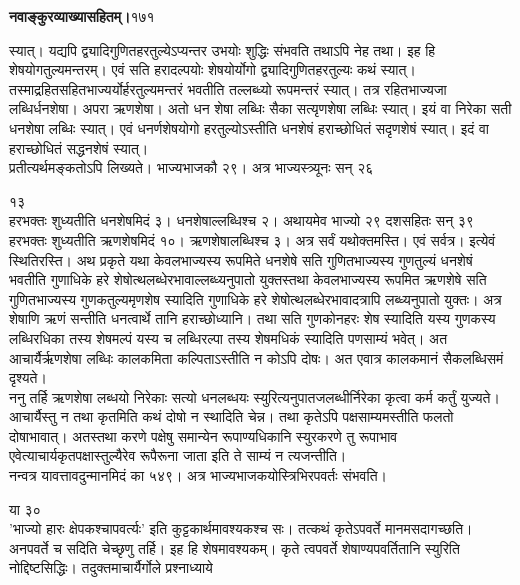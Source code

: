 \documentclass[11pt, openany]{book}
\begin{document}
\onehalfspacing
\hspace{2in}\textbf{नवाङ्कुरव्याख्यासहितम्।}\hspace{2in}१७१

\vspace{5mm}

\begin{sloppypar}
\hangindent=0.2in स्यात्। यद्यपि द्व्यादिगुणितहरतुल्येऽप्यन्तर उभयोः शुद्धिः संभवति तथाऽपि नेह तथा। इह हि शेषयोगतुल्यमन्तरम्। एवं सति हरादल्पयोः शेषयोर्योगो द्व्यादिगुणितहरतुल्यः कथं स्यात्। तस्माद्रहितसहितभाज्यर्योर्हरतुल्यमन्तरं भवतीति तल्लब्ध्यो रूपमन्तरं स्यात्। तत्र रहितभाज्यजा लब्धिर्धनशेषा। अपरा ऋणशेषा। अतो धन शेषा लब्धिः सैका सत्यृणशेषा लब्धिः स्यात्। इयं वा निरेका सती धनशेषा लब्धिः स्यात्। एवं धनर्णशेषयोगो हरतुल्योऽस्तीति धनशेषं हराच्छोधितं सदृणशेषं स्यात्। इदं वा हराच्छोधितं सद्धनशेषं स्यात्।\\

\hangindent=0.2in \hspace{0.2in}प्रतीत्यर्थमङ्कतोऽपि लिख्यते। भाज्यभाजकौ २९। अत्र भाज्यस्त्र्यूनः सन् २६ 

\hspace{2.85in}१३\\

\hangindent=0.2in हरभक्तः शुध्यतीति धनशेषमिदं ३। धनशेषाल्लब्धिश्च २। अथायमेव भाज्यो २९ दशसहितः सन् ३९ हरभक्तः शुध्यतीति ऋणशेषमिदं १०। ऋणशेषालब्धिश्च ३। अत्र सर्वं यथोक्तमस्ति। एवं सर्वत्र। इत्येवं स्थितिरस्ति। अथ प्रकृते यथा केवलभाज्यस्य रूपमिते धनशेषे सति गुणितभाज्यस्य गुणतुल्यं धनशेषं भवतीति गुणाधिके हरे शेषोत्थलब्धेरभावाल्लब्ध्यनुपातो युक्तस्तथा केवलभाज्यस्य रूपमित ऋणशेषे सति गुणितभाज्यस्य गुणकतुल्यमृणशेष स्यादिति गुणाधिके हरे शेषोत्थलब्धेरभावादत्रापि लब्ध्यनुपातो युक्तः। अत्र शेषाणि ऋणं सन्तीति धनत्वार्थे तानि हराच्छोध्यानि। तथा सति गुणकोनहरः शेष स्यादिति यस्य गुणकस्य लब्धिरधिका तस्य शेषमल्पं यस्य च लब्धिरल्पा तस्य शेषमधिकं स्यादिति पणसाम्यं भवेत्। अत आचार्यैर्ऋणशेषा लब्धिः कालकमिता कल्पिताऽस्तीति न कोऽपि दोषः। अत एवात्र कालकमानं सैकलब्धिसमं दृश्यते।\\

\hangindent=0.2in \hspace{0.2in}ननु तर्हि ऋणशेषा लब्धयो निरेकाः सत्यो धनलब्धयः स्युरित्यनुपातजलब्धीर्निरेका कृत्वा कर्म कर्तुं युज्यते। आचार्यैस्तु न तथा कृतमिति कथं दोषो न स्थादिति चेन्न। तथा कृतेऽपि पक्षसाम्यमस्तीति फलतो दोषाभावात्। अतस्तथा करणे पक्षेषु समान्येन रूपाण्यधिकानि स्युरकरणे तु रूपाभाव एवेत्याचार्यकृतपक्षास्तुल्यैरेव रूपैरूना जाता इति ते साम्यं न त्यजन्तीति।\\

\hangindent=0.2in \hspace{0.2in}नन्वत्र यावत्तावदुन्मानमिदं का ५४९। अत्र भाज्यभाजकयोस्त्रिभिरपवर्तः संभवति।

\hspace{1.8in}या ३०\\

\hangindent=0.2in 'भाज्यो हारः क्षेपकश्चापवर्त्यः' इति कुट्टकार्थमावश्यकश्च सः। तत्कथं कृतेऽपवर्ते मानमसदागच्छति। अनपवर्ते च सदिति चेच्छृणु तर्हि। इह हि शेषमावश्यकम्। कृते त्वपवर्ते शेषाण्यपवर्तितानि स्युरिति नोद्दिष्टसिद्धिः। तदुक्तमाचार्यैर्गोले प्रश्नाध्याये\textendash
\end{sloppypar}
\thispagestyle{empty}
\newpage
\end{document}
